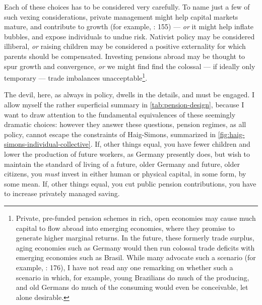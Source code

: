 Each of these choices has to be considered very carefully. To name just a few of such vexing considerations, private management might help capital markets mature, and contribute to growth (for example, \citealt{Barr2005a}: 155) --- \emph{or} it might help inflate bubbles, and expose individuals to undue risk. Nativist policy may be considered illiberal, \emph{or} raising children may be considered a positive externality for which parents should be compensated. Investing pensions abroad may be thought to spur growth and convergence, \emph{or} we might find find the colossal --- if ideally only temporary --- trade imbalances unacceptable\footnote{
	Private, pre-funded pension schemes in rich, open economies may cause much capital to flow abroad into emerging economies, where they promise to generate higher marginal returns. In the future, these formerly trade surplus, aging economies such as Germany would then run colossal trade deficits with emerging economies such as Brasil. While many advocate such a scenario (for example, \citealt{Borsch-Supan2003}: 176), I have not read any one remarking on whether such a scenario in which, for example, young Brazilians do much of the producing, and old Germans do much of the consuming would even be conceivable, let alone desirable.}.

The devil, here, as always in policy, dwells in the details, and must be engaged. I allow myself the rather superficial summary in \autoref{tab:pension-design}, because I want to draw attention to the fundamental equivalences of these seemingly dramatic choices: however they answer these questions, pension regimes, as all policy, cannot escape the constraints of Haig-Simons, summarized in \autoref{fig:haig-simons-individual-collective}. If, other things equal, you have fewer children and lower the production of future workers, as Germany presently does, but wish to maintain the standard of living of a future, older Germany and future, older citizens, you \emph{must} invest in either human or physical capital, in some form, by some mean. If,  other things equal, you cut public pension contributions, you have to increase privately managed saving.

